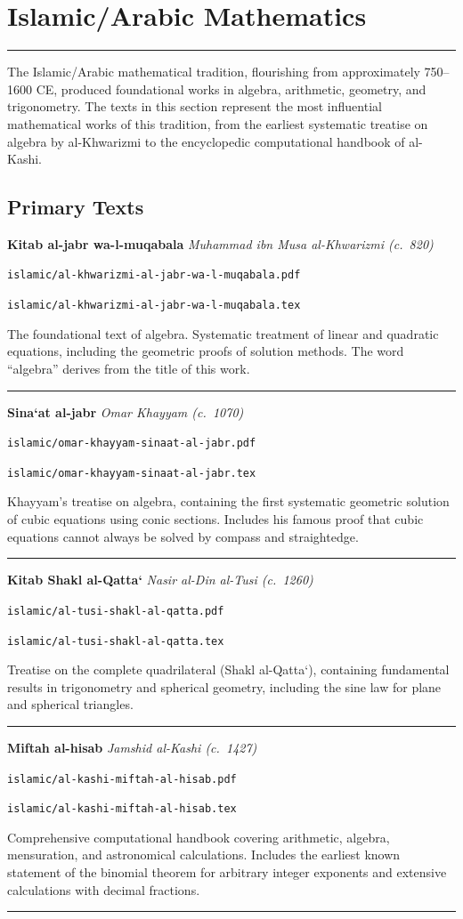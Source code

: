 \documentclass[11pt,a4paper]{article}
\newcommand{\workitem}[5]{%
  \par\smallskip
  \noindent\textbf{\large #1} \hfill \textit{#2}\par
  \noindent\texttt{\small #3}\par
  \noindent\texttt{\small #4}\par
  \noindent #5\par
  \smallskip\noindent\rule{\textwidth}{0.2pt}
}
\newcommand{\islamicsection}[1]{%
  \section[{#1}]{\textcolor{islamiccolor}{#1}}
}
\begin{document}
\newpage

\islamicsection{Islamic/Arabic Mathematics}
\label{sec:islamic}

\begin{center}
\textcolor{islamiccolor}{\rule{0.8\textwidth}{1pt}}
\end{center}

The Islamic/Arabic mathematical tradition, flourishing from approximately 750--1600 CE, produced foundational works in algebra, arithmetic, geometry, and trigonometry. The texts in this section represent the most influential mathematical works of this tradition, from the earliest systematic treatise on algebra by al-Khwarizmi to the encyclopedic computational handbook of al-Kashi.

\subsection*{Primary Texts}

\workitem
  {Kitab al-jabr wa-l-muqabala}
  {Muhammad ibn Musa al-Khwarizmi (c.~820)}
  {islamic/al-khwarizmi-al-jabr-wa-l-muqabala.pdf}
  {islamic/al-khwarizmi-al-jabr-wa-l-muqabala.tex}
  {The foundational text of algebra. Systematic treatment of linear and quadratic equations, including the geometric proofs of solution methods. The word ``algebra'' derives from the title of this work.}

\workitem
  {Sina`at al-jabr}
  {Omar Khayyam (c.~1070)}
  {islamic/omar-khayyam-sinaat-al-jabr.pdf}
  {islamic/omar-khayyam-sinaat-al-jabr.tex}
  {Khayyam's treatise on algebra, containing the first systematic geometric solution of cubic equations using conic sections. Includes his famous proof that cubic equations cannot always be solved by compass and straightedge.}

\workitem
  {Kitab Shakl al-Qatta`}
  {Nasir al-Din al-Tusi (c.~1260)}
  {islamic/al-tusi-shakl-al-qatta.pdf}
  {islamic/al-tusi-shakl-al-qatta.tex}
  {Treatise on the complete quadrilateral (Shakl al-Qatta`), containing fundamental results in trigonometry and spherical geometry, including the sine law for plane and spherical triangles.}

\workitem
  {Miftah al-hisab}
  {Jamshid al-Kashi (c.~1427)}
  {islamic/al-kashi-miftah-al-hisab.pdf}
  {islamic/al-kashi-miftah-al-hisab.tex}
  {Comprehensive computational handbook covering arithmetic, algebra, mensuration, and astronomical calculations. Includes the earliest known statement of the binomial theorem for arbitrary integer exponents and extensive calculations with decimal fractions.}
\end{document}

